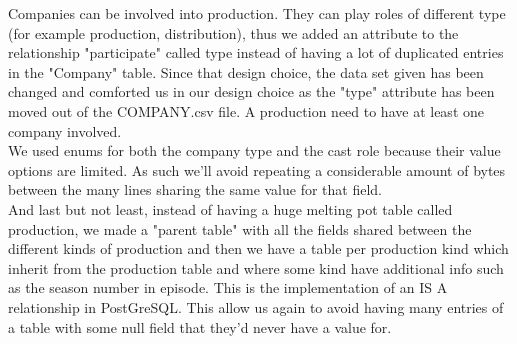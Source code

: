 \documentclass{article}
\begin{document}
    Companies can be involved into production. They can play roles of different type (for example production, distribution), thus we added an attribute to the relationship "participate" called type instead of having a lot of duplicated entries in the "Company" table. Since that design choice, the data set given has been changed and comforted us in our design choice as the "type" attribute has been moved out of the COMPANY.csv file. A production need to have at least one company involved.\\
    
    We used enums for both the company type and the cast role because their value options are limited. As such we'll avoid repeating a considerable amount of bytes between the many lines sharing the same value for that field.\\
    
    And last but not least, instead of having a huge melting pot table called production, we made a "parent table" with all the fields shared between the different kinds of production and then we have a table per production kind which inherit from the production table and where some kind have additional info such as the season number in episode. This is the implementation of an IS A relationship in PostGreSQL. This allow us again to avoid having many entries of a table with some null field that they'd never have a value for.
 
\end{document}

